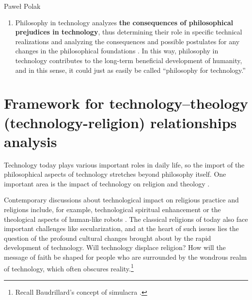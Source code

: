 \begin{artengenv}{Paweł Polak}
\begin{enumerate}[label=(\Roman*)]
\item Philosophy in technology analyzes \textbf{the consequences of philosophical prejudices in technology}, thus determining their role in specific technical realizations and analyzing the consequences and possible postulates for any changes in the philosophical foundations 
\parencites[e.g.,][]{smith_promise_2019}[][]{suchacka_human_2021}[][]{wieczorek_conscience_2021}. %
 In this way, philosophy in technology contributes to the long-term beneficial development of humanity, and in this sense, it could just as easily be called ``philosophy for technology.''
\end{enumerate}


\section[Framework for technology–theology (technology-religion) relationships analysis]{Framework for technology–theology (technology-religion) relationships analysis\footnotemark}


Technology today plays various important roles in daily life, so the import of the philosophical aspects of technology stretches beyond philosophy itself. One important area is the impact of technology on religion and theology 
\parencite[e.g.,][]{salamon_religia_2016}.%




Contemporary discussions about technological impact on religious practice and religions include, for example, technological spiritual enhancement 
\parencite[e.g.,][]{wildman_spirit_2021} %
 or the theological aspects of human-like robots 
\parencite[][]{balle_theological_2022}. %
 The classical religions of today also face important challenges like secularization, and at the heart of such issues lies the question of the profound cultural changes brought about by the rapid development of technology. Will technology displace religion? How will the message of faith be shaped for people who are surrounded by the wondrous realm of technology, which often obscures reality.\footnote{Recall Baudrillard's concept of simulacra 
\parencite[][]{baudrillard_simulacra_1994}.%
}




\end{artengenv}
